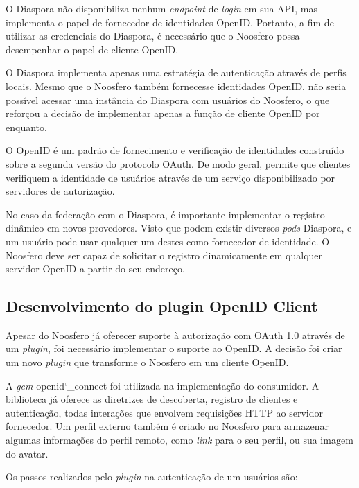 
O Diaspora não disponibiliza nenhum \textit{endpoint} de \textit{login} em sua API,
mas implementa o papel de fornecedor de identidades OpenID. Portanto, a fim de
utilizar as credenciais do Diaspora, é necessário que o Noosfero possa desempenhar o
papel de cliente OpenID.

O Diaspora implementa apenas uma estratégia de autenticação através de perfis
locais. Mesmo que o Noosfero também fornecesse identidades OpenID, não seria
possível acessar uma instância do Diaspora com usuários do Noosfero, o que reforçou
a decisão de implementar apenas a função de cliente OpenID por enquanto.

O OpenID é um padrão de fornecimento e verificação de identidades construído sobre a
segunda versão do protocolo OAuth. De modo geral, permite que clientes verifiquem a
identidade de usuários através de um serviço disponibilizado por servidores de
autorização.


No caso da federação com o Diaspora, é importante implementar o registro dinâmico em
novos provedores. Visto que podem existir diversos \textit{pods} Diaspora, e um
usuário pode usar qualquer um destes como fornecedor de identidade. O Noosfero deve
ser capaz de solicitar o registro dinamicamente em qualquer servidor OpenID a partir
do seu endereço.

\subsection{Desenvolvimento do plugin OpenID Client}

Apesar do Noosfero já oferecer suporte à autorização com OAuth 1.0 através de um
\textit{plugin}, foi necessário implementar o suporte ao OpenID. A decisão foi criar
um novo \textit{plugin} que transforme o Noosfero em um cliente OpenID.

A \textit{gem} openid\char`_connect foi utilizada na implementação do consumidor. A
biblioteca já oferece as diretrizes de descoberta, registro de clientes e
autenticação, todas interações que envolvem requisições HTTP ao servidor fornecedor.
Um perfil externo também é criado no Noosfero para armazenar algumas informações do
perfil remoto, como \textit{link} para o seu perfil, ou sua imagem do avatar.

Os passos realizados pelo \textit{plugin} na autenticação de um usuários são:

